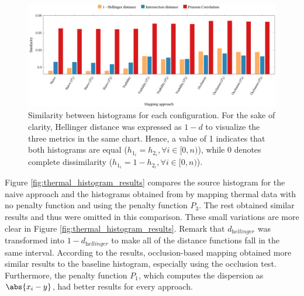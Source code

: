\begin{figure}
    \centering
    \includegraphics[width=\linewidth]{figs/thermal_projection/distance_similarity.png}
	\caption{Similarity between histograms for each configuration. For the sake of clarity, Hellinger distance was expressed as $1 - d$ to visualize the three metrics in the same chart. Hence, a value of 1 indicates that both histograms are equal ($h_{1_{i}} = h_{2_{i}}, \forall i \in [0, n)$), while 0 denotes complete dissimilarity ($h_{1_{i}} = 1 - h_{2_{i}}, \forall i \in [0, n)$).}
	\label{fig:thermal_histogram_results_02}
\end{figure}


Figure \ref{fig:thermal_histogram_results} compares the source histogram for the naive approach and the histograms obtained from by mapping thermal data with no penalty function and using the penalty function $P_3$. The rest obtained similar results and thus were omitted in this comparison. These small variations are more clear in Figure \ref{fig:thermal_histogram_results}. Remark that $d_{\textit{hellinger}}$ was transformed into $1 - d_{\textit{hellinger}}$ to make all of the distance functions fall in the same interval. According to the results, occlusion-based mapping obtained more similar results to the baseline histogram, especially using the occlusion test. Furthermore, the penalty function $P_1$, which computes the dispersion as $\abs{x_i - y}$, had better results for every approach.


